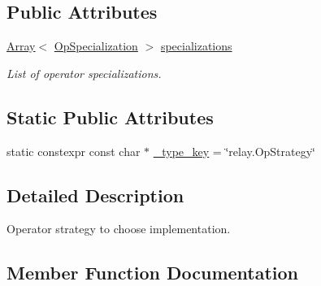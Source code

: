\subsection*{Public Attributes}
\begin{DoxyCompactItemize}
\item 
\hyperlink{classtvm_1_1Array}{Array}$<$ \hyperlink{classtvm_1_1relay_1_1OpSpecialization}{Op\+Specialization} $>$ \hyperlink{classtvm_1_1relay_1_1OpStrategyNode_a32d7610bdfd32c485b5f579daac2aeff}{specializations}
\begin{DoxyCompactList}\small\item\em List of operator specializations. \end{DoxyCompactList}\end{DoxyCompactItemize}
\subsection*{Static Public Attributes}
\begin{DoxyCompactItemize}
\item 
static constexpr const char $\ast$ \hyperlink{classtvm_1_1relay_1_1OpStrategyNode_a6b7991cb900e90a42f889359dd7956a0}{\+\_\+type\+\_\+key} = \char`\"{}relay.\+Op\+Strategy\char`\"{}
\end{DoxyCompactItemize}


\subsection{Detailed Description}
Operator strategy to choose implementation. 

\subsection{Member Function Documentation}
